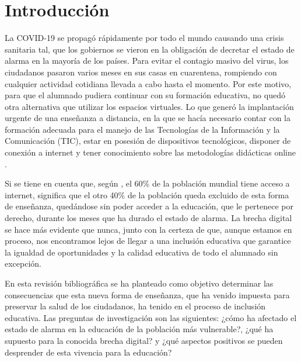\documentclass[spanish]{textolivre}
\begin{document}
\begin{polyabstract}
\begin{english}
\begin{abstract}
\end{abstract}
\end{english}

\end{polyabstract}


\section{Introducción}\label{sec-intro}
La COVID-19 se propagó rápidamente por todo el mundo causando una crisis sanitaria tal, que los gobiernos se vieron en la obligación de decretar el estado de alarma en la mayoría de los países. Para evitar el contagio masivo del virus, los ciudadanos pasaron varios meses en sus casas en cuarentena, rompiendo con cualquier actividad cotidiana llevada a cabo hasta el momento. Por este motivo, para que el alumnado pudiera continuar con su formación educativa, no quedó otra alternativa que utilizar los espacios virtuales. Lo que generó la implantación urgente de una enseñanza a distancia, en la que se hacía necesario contar con la formación adecuada para el manejo de las Tecnologías de la Información y la Comunicación (TIC), estar en posesión de dispositivos tecnológicos, disponer de conexión a internet y tener conocimiento sobre las metodologías didácticas online \cite{rojaslondono2020}.

Si se tiene en cuenta que, según \textcite{globaldigital2020}, el 60\% de la población mundial tiene acceso a internet, significa que el otro 40\% de la población queda excluido de esta forma de enseñanza, quedándose sin poder acceder a la educación, que le pertenece por derecho, durante los meses que ha durado el estado de alarma. La brecha digital se hace más evidente que nunca, junto con la certeza de que, aunque estamos en proceso, nos encontramos lejos de llegar a una inclusión educativa que garantice la igualdad de oportunidades y la calidad educativa de todo el alumnado sin excepción.

En esta revisión bibliográfica se ha planteado como objetivo determinar las consecuencias que esta nueva forma de enseñanza, que ha venido impuesta para preservar la salud de los ciudadanos, ha tenido en el proceso de inclusión educativa. Las preguntas de investigación son las siguientes: ¿cómo ha afectado el estado de alarma en la educación de la población más vulnerable?, ¿qué ha supuesto para la conocida brecha digital? y ¿qué aspectos positivos se pueden desprender de esta vivencia para la educación?
\end{document}
